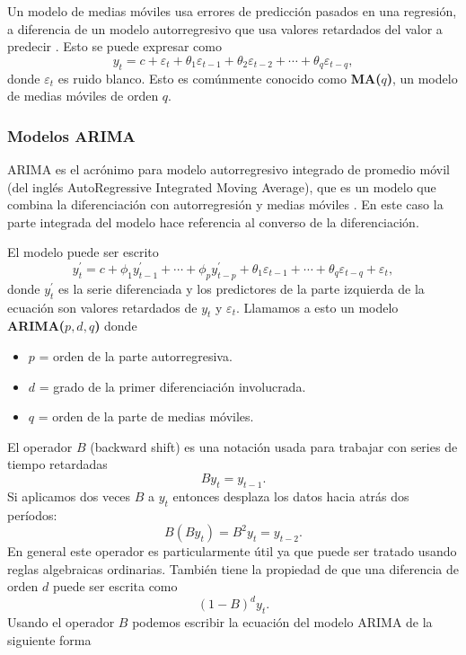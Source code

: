 Un modelo de medias móviles usa errores de predicción pasados en una regresión, a diferencia de un modelo autorregresivo que usa valores retardados del valor a predecir \parencite{hyndmanForecastingPrinciplesPractice2018}. Esto se puede expresar como
\[ y_{t}=c+\varepsilon_{t}+\theta_{1} \varepsilon_{t-1}+\theta_{2} \varepsilon_{t-2}+\cdots+\theta_{q} \varepsilon_{t-q}, \]
donde $\varepsilon_{t}$ es ruido blanco. Esto es comúnmente conocido como \textbf{MA($q$)}, un modelo de medias móviles de orden $q$.

\subsubsection{Modelos ARIMA}

ARIMA es el acrónimo para modelo autorregresivo integrado de promedio móvil (del inglés AutoRegressive Integrated Moving Average), que es un modelo que combina la diferenciación con autorregresión y medias móviles \parencite{hyndmanForecastingPrinciplesPractice2018}. En este caso la parte integrada del modelo hace referencia al converso de la diferenciación. 

El modelo puede ser escrito 
\[ y_{t}^{\prime}=c+\phi_{1} y_{t-1}^{\prime}+\cdots+\phi_{p} y_{t-p}^{\prime}+\theta_{1} \varepsilon_{t-1}+\cdots+\theta_{q} \varepsilon_{t-q}+\varepsilon_{t}, \]
donde $y_{t}^{\prime}$ es la serie diferenciada y los predictores de la parte izquierda de la ecuación son valores retardados de $y_t$ y $\varepsilon_t$. Llamamos a esto un modelo \textbf{ARIMA($p,d,q$)} donde

\begin{itemize}
\item $p$ = orden de la parte autorregresiva.
\item $d$ = grado de la primer diferenciación involucrada.
\item $q$ = orden de la parte de medias móviles.
\end{itemize}

El operador $B$ (backward shift) es una notación usada para trabajar con series de tiempo retardadas
\[ B y_{t}=y_{t-1}. \]
Si aplicamos dos veces $B$ a $y_t$ entonces desplaza los datos hacia atrás dos períodos: 
\[B\left(B y_{t}\right)=B^{2} y_{t}=y_{t-2}.\]
En general este operador es particularmente útil ya que puede ser tratado usando reglas algebraicas ordinarias. También tiene la propiedad de que una diferencia de orden $d$ puede ser escrita como
\[
(1-B)^{d} y_{t}.
\]
Usando el operador $B$ podemos escribir la ecuación del modelo ARIMA de la siguiente forma

